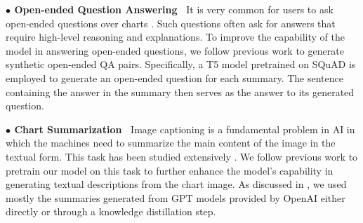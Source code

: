 \noindent \textbf{$\bullet$ {Open-ended Question Answering}~} It is very common for users to ask open-ended questions over charts \cite{open-CQA}. Such questions often ask for answers that require high-level reasoning and explanations. To improve the capability of the model in answering open-ended questions, we follow previous work \cite{table-oqa} to generate synthetic open-ended QA pairs. Specifically, a T5 model \cite{Raffel2020t5} pretrained on SQuAD \cite{squadv1} is employed to generate an open-ended  question for each summary. The sentence containing the answer in the summary then serves as the answer to its generated question.


\noindent \textbf{$\bullet$ { Chart Summarization}~}
Image captioning is a fundamental problem in AI in which the machines need to summarize the main content of the image in the textual form. This task has been studied extensively \cite{vinyals2015show, herdade2019image, hu2021vivo, li2022blip}. We follow previous work \cite{vinyals2015show, xia2021xgpt} to pretrain our model on this task to further enhance the model's capability in generating textual descriptions from the chart image. As discussed in , we used mostly the summaries generated from GPT models provided by OpenAI either directly or through a knowledge distillation step.



 